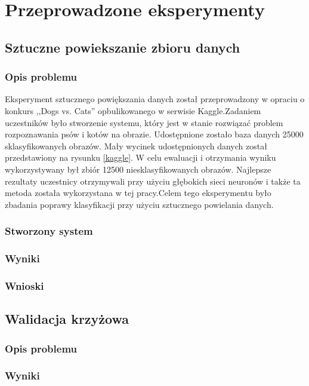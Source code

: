 \section{Przeprowadzone eksperymenty} \label{results}


\subsection{Sztuczne powiekszanie zbioru danych}
\subsubsection{Opis problemu}
Eksperyment sztucznego powiększania danych został przeprowadzony w opraciu o konkurs ,,Dogs vs. Cats'' opbulikowanego w serwisie Kaggle.\footnotemark Zadaniem uczestników było stworzenie systemu, który jest w stanie rozwiązać problem rozpoznawania psów i kotów na obrazie. Udostępnione zostało baza danych 25000 sklasyfikowanych obrazów. Mały wycinek udostępnionych danych został przedstawiony na rysunku \ref{kaggle}. W celu ewaluacji i otrzymania wyniku wykorzystywany był zbiór 12500 niesklasyfikowanych obrazów. Najlepsze rezultaty uczestnicy otrzymywali przy użyciu głębokich sieci neuronów i także ta metoda została wykorzystana w tej pracy.Celem tego eksperymentu było zbadania poprawy klasyfikacji przy użyciu sztucznego powielania danych.
\subsubsection{Stworzony system}
\subsubsection{Wyniki}
\subsubsection{Wnioski}

\subsection{Walidacja krzyżowa}
\subsubsection{Opis problemu}
\subsubsection{Wyniki}

